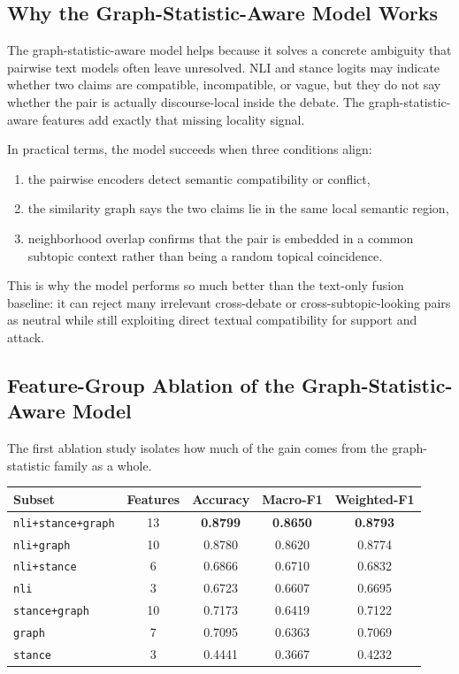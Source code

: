 \documentclass[11pt,a4paper]{article}
\begin{document}
\subsection{Why the Graph-Statistic-Aware Model Works}
The graph-statistic-aware model helps because it solves a concrete ambiguity that pairwise text models often leave
unresolved. NLI and stance logits may indicate whether two claims are compatible, incompatible, or vague, but they do
not say whether the pair is actually discourse-local inside the debate. The graph-statistic-aware features add exactly
that missing locality signal.

In practical terms, the model succeeds when three conditions align:
\begin{enumerate}[label=\arabic*.]
  \item the pairwise encoders detect semantic compatibility or conflict,
  \item the similarity graph says the two claims lie in the same local semantic region,
  \item neighborhood overlap confirms that the pair is embedded in a common subtopic context rather than being a random topical coincidence.
\end{enumerate}
This is why the model performs so much better than the text-only fusion baseline: it can reject many irrelevant
cross-debate or cross-subtopic-looking pairs as neutral while still exploiting direct textual compatibility for support
and attack.

\subsection{Feature-Group Ablation of the Graph-Statistic-Aware Model}
The first ablation study isolates how much of the gain comes from the graph-statistic family as a whole.

\begin{center}
\begin{tabular}{lcccc}
\toprule
Subset & Features & Accuracy & Macro-F1 & Weighted-F1 \\
\midrule
\texttt{nli+stance+graph} & 13 & \textbf{0.8799} & \textbf{0.8650} & \textbf{0.8793} \\
\texttt{nli+graph} & 10 & 0.8780 & 0.8620 & 0.8774 \\
\texttt{nli+stance} & 6 & 0.6866 & 0.6710 & 0.6832 \\
\texttt{nli} & 3 & 0.6723 & 0.6607 & 0.6695 \\
\texttt{stance+graph} & 10 & 0.7173 & 0.6419 & 0.7122 \\
\texttt{graph} & 7 & 0.7095 & 0.6363 & 0.7069 \\
\texttt{stance} & 3 & 0.4441 & 0.3667 & 0.4232 \\
\bottomrule
\end{tabular}
\end{center}
\end{document}
